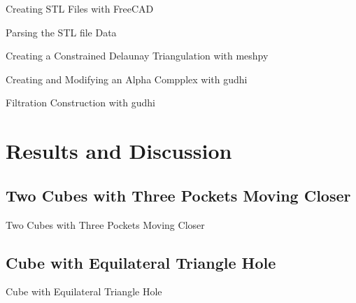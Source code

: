\documentclass[xcolor=dvipsnames, aspectratio=169]{beamer}
\begin{document}
\begin{frame}{Creating STL Files with FreeCAD}

\end{frame}

\begin{frame}{Parsing the STL file Data}

\end{frame}

\begin{frame}{Creating a Constrained Delaunay Triangulation with meshpy}

\end{frame}

\begin{frame}{Creating and Modifying an Alpha Compplex with gudhi}

\end{frame}

\begin{frame}{Filtration Construction with gudhi}

\end{frame}

\section{Results and Discussion}
\subsection{Two Cubes with Three Pockets Moving Closer}
\begin{frame}{Two Cubes with Three Pockets Moving Closer}

\end{frame}

\subsection{Cube with Equilateral Triangle Hole}
\begin{frame}{Cube with Equilateral Triangle Hole}

\end{frame}
\end{document}
